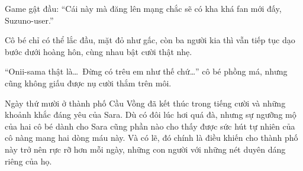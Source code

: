 \documentclass[../main.tex]{subfiles}
\begin{document}
Game gật đầu: ``Cái này mà đăng lên mạng chắc sẽ có kha khá fan mới đấy, Suzuno-user.''

Cô bé chỉ có thể lắc đầu, mặt đỏ như gấc, còn ba người kia thì vẫn tiếp tục dạo bước dưới hoàng hôn, cùng nhau bật cười thật nhẹ.

``Onii-sama thật là\dots\ Đừng có trêu em như thế chứ\dots'' cô bé phồng má, nhưng cũng không giấu được nụ cười thắm trên môi.

Ngày thứ mười ở thành phố Cầu Vồng đã kết thúc trong tiếng cười và những khoảnh khắc đáng yêu của Sara. Dù có đôi lúc hơi quá đà, nhưng sự ngưỡng mộ của hai cô bé dành cho Sara cũng phần nào cho thấy được sức hút tự nhiên của cô nàng mang hai dòng máu này. Và có lẽ, đó chính là điều khiến cho thành phố này trở nên rực rỡ hơn mỗi ngày, những con người với những nét duyên dáng riêng của họ.
\end{document}
